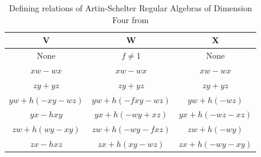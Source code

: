 \documentclass{amsart}
\begin{document}
\begin{table}[H]
{{\begin{tabular}{|c|c|c|}
 \textbf{V} & \textbf{W} & \textbf{X} \\ \hline \hline
 None & $f \neq 1$ & None \\ \hline
 $xw - wx$ & $xw - wx$ & $xw - wx$ \\ 
 $zy + yz$ & $zy + yz$ & $zy + yz$ \\ 
$yw + h(-xy - wz)$ & $yw + h(-fxy - wz)$ & $yw + h(-wz)$ \\ 
 $yx - hxy$ & $yx + h(-wy + xz)$ & $yx + h(-wz - xz)$ \\ 
 $zw + h(wy - xy)$ & $zw + h(-wy - fxz)$ & $zw + h(-wy)$ \\
 $zx - hxz$ & $zx + h(xy - wz)$ & $zx + h(-wy - xy)$ \\ \hline
\end{tabular}
}}
\caption{Defining relations of Artin-Schelter Regular Algebras of Dimension Four from \cite{MR2529094}}
\end{table}
\end{document}
